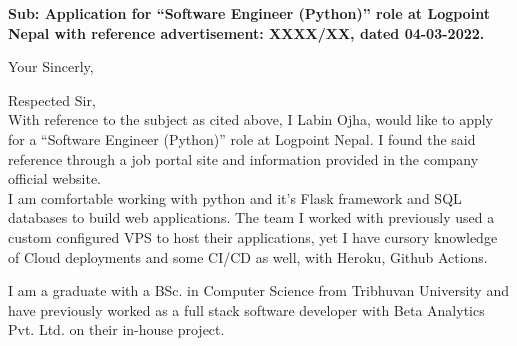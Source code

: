\documentclass[11pt,a4paper,roman]{moderncv}
\begin{document}
\date{\today}
\opening{\textbf{Sub: Application for “Software Engineer (Python)” role at
        Logpoint Nepal with reference advertisement: XXXX/XX, dated 04-03-2022.}}
\closing{Your Sincerly, \vspace{-1em}}


\makelettertitle



Respected Sir,
\\
\vspace{1em}
With reference to the subject as cited above, I Labin Ojha, would like to
apply for a “Software Engineer (Python)” role at Logpoint Nepal. I found
the said reference through a job portal site and information provided in
the company official website.\\

\vspace{1em}
I am comfortable working with python and it’s Flask framework and SQL
databases to build web applications. The team I worked with previously
used a custom configured VPS to host their applications, yet I have
cursory knowledge of Cloud deployments and some CI/CD as well, with Heroku,
Github Actions.  \\
\vspace{1em}

I am a graduate with a BSc. in Computer Science from Tribhuvan University
and have previously worked as a full stack software developer with Beta
Analytics Pvt. Ltd. on their in-house project.
\end{document}
